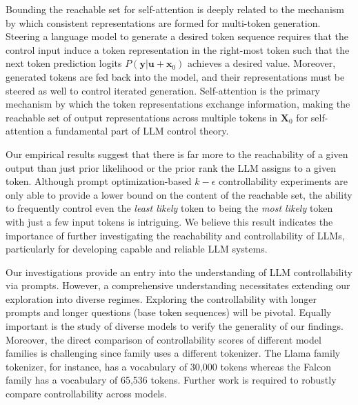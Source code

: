\documentclass{article} %
\begin{document}
Bounding the reachable set for self-attention is deeply related to the mechanism by which consistent representations are formed for multi-token generation.
Steering a language model to generate a desired token sequence requires that the control input induce a token representation in the right-most token such that the next token prediction logits $P(\mathbf y | \mathbf u + \mathbf x_0)$ achieves a desired value. 
Moreover, generated tokens are fed back into the model, and their representations must be steered as well to control iterated generation.
Self-attention is the primary mechanism by which the token representations exchange information, making the reachable set of output representations across multiple tokens in $\mathbf X_0$ for self-attention a fundamental part of LLM control theory. 


Our empirical results suggest that there is far more to the reachability of a given output than just prior likelihood or the prior rank the LLM assigns to a given token. 
Although prompt optimization-based $k-\epsilon$ controllability experiments are only able to provide a lower bound on the content of the reachable set, the ability to frequently control even the \textit{least likely} token to being the \textit{most likely} token with just a few input tokens is intriguing. 
We believe this result indicates the importance of further investigating the reachability and controllability of LLMs, particularly for developing capable and reliable LLM systems. 


Our investigations provide an entry into the understanding of LLM controllability via prompts. However, a comprehensive understanding necessitates extending our exploration into diverse regimes. 
Exploring the controllability with longer prompts and longer questions (base token sequences) will be pivotal. 
Equally important is the study of diverse models to verify the generality of our findings. %
Moreover, the direct comparison of controllability scores of different model families is challenging since family uses a different tokenizer. The Llama family tokenizer, for instance, has a vocabulary of 30,000 tokens whereas the Falcon family has a vocabulary of 65,536 tokens. Further work is required to robustly compare controllability across models. 
\end{document}
